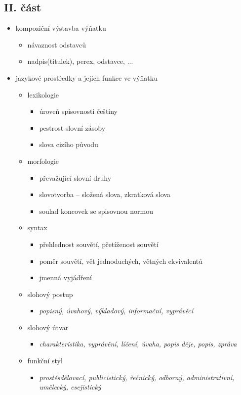 \subsection{II. část}
\begin{itemize}
\item kompoziční výstavba výňatku
\begin{itemize}
\item návaznost odstavců
\item nadpis(titulek), perex, odstavce, ...
\end{itemize}
\item jazykové prostředky a jejich funkce ve výňatku
\begin{itemize}
\item lexikologie
	\begin{itemize}
	\item úroveň spisovnosti češtiny 
	\item pestrost slovní zásoby
	\item slova cizího původu
	\end{itemize}
\item morfologie
	\begin{itemize}
	\item převažující slovní druhy
	\item slovotvorba -- složená slova, zkratková slova
	\item soulad koncovek se spisovnou normou
	\end{itemize}
\item syntax
	\begin{itemize}
	\item přehlednost souvětí, přetíženost souvětí
	\item poměr souvětí, vět jednoduchých, větných ekvivalentů
	\item jmenná vyjádření
	\end{itemize}
\item slohový postup
\begin{itemize}
\item \textit{popisný, úvahový, výkladový, informační, vyprávěcí}
\end{itemize}
\item slohový útvar
\begin{itemize}
\item \textit{charakteristika, vyprávění, líčení, úvaha, popis děje, popis, zpráva}
\end{itemize}
\item funkční styl
\begin{itemize}
\item \textit{prostěsdělovací, publicistický, řečnický, odborný, administrativní, umělecký, esejistický}
\end{itemize}
\end{itemize}
\end{itemize}

